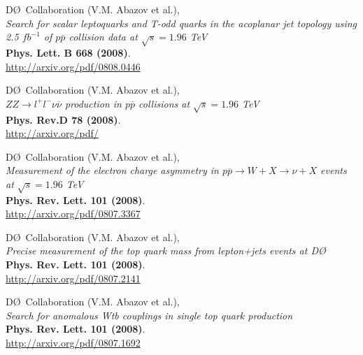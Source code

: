 \documentclass[12pt]{article}
\begin{document}
%
D\O~Collaboration (V.M. Abazov et al.), \\
\textsl{Search for scalar leptoquarks and T-odd quarks in the acoplanar jet topology using 2.5 $fb^{-1}$ of $p\overline{p}$ collision data at $\sqrt{s}=1.96$ TeV}\\
\textbf{Phys. Lett. B 668 (2008)}.\\
{\small{\url{http://arxiv.org/pdf/0808.0446}}}\vspace{4mm}

%
D\O~Collaboration (V.M. Abazov et al.), \\
\textsl{$ZZ\rightarrow l^{+} l^{-}\nu\overline{\nu}$ production in $p\overline{p}$ collisions at $\sqrt{s}=1.96$ TeV}\\
\textbf{Phys. Rev.D 78 (2008)}.\\
{\small{\url{http://arxiv.org/pdf/}}}\vspace{4mm}

%
D\O~Collaboration (V.M. Abazov et al.), \\
\textsl{Measurement of the electron charge asymmetry in $p\overline{p}\rightarrow W+X\rightarrow \nu+X$ events at $\sqrt{s}=1.96$ TeV}\\
\textbf{Phys. Rev. Lett. 101 (2008)}.\\
{\small{\url{http://arxiv.org/pdf/0807.3367}}}\vspace{4mm}

%
D\O~Collaboration (V.M. Abazov et al.), \\
\textsl{Precise measurement of the top quark mass from lepton+jets events at D\O}\\
\textbf{Phys. Rev. Lett. 101 (2008)}.\\
{\small{\url{http://arxiv.org/pdf/0807.2141}}}\vspace{4mm}

%
D\O~Collaboration (V.M. Abazov et al.), \\
\textsl{Search for anomalous Wtb couplings in single top quark production}\\
\textbf{Phys. Rev. Lett. 101 (2008)}.\\
{\small{\url{http://arxiv.org/pdf/0807.1692}}}\vspace{4mm}
\end{document}
